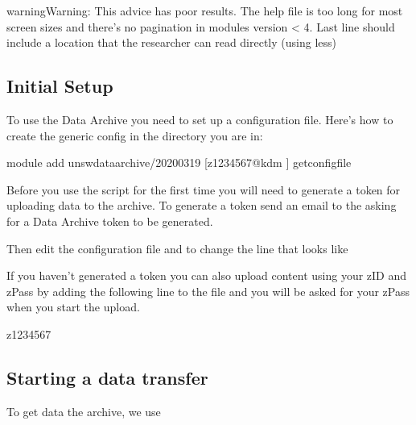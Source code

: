 \documentclass[letterpaper,10pt,english]{sphinxmanual}
\begin{document}
\begin{sphinxadmonition}{warning}{Warning:}
This advice has poor results. The help file is too long for most screen sizes and there’s no pagination in modules version < 4. Last line should include a location that the researcher can read directly (using less)
\end{sphinxadmonition}


\subsection{Initial Setup}
\label{\detokenize{storage/data_archive:initial-setup}}
To use the Data Archive you need to set up a configuration file. Here’s how to create the generic config in the directory you are in:

\begin{sphinxVerbatim}\PYGZdl{} module add unswdataarchive/2020\PYGZhy{}03\PYGZhy{}19
[z1234567@kdm \PYGZti{}]\PYGZdl{} get\PYGZhy{}config\PYGZhy{}file
\end{sphinxVerbatim}

Before you use the script for the first time you will need to generate a token for uploading data to the archive. To generate a token send an email to the  asking for a Data Archive token to be generated.

Then edit the configuration file  and to change the line that looks like 

If you haven’t generated a token you can also upload content using your zID and zPass by adding the following line to the file  and you will be asked for your zPass when you start the upload.

\begin{sphinxVerbatim}[commandchars=\\\{\}]
z1234567
\end{sphinxVerbatim}


\subsection{Starting a data transfer}
\label{\detokenize{storage/data_archive:starting-a-data-transfer}}
To get data  the archive, we use 
\end{document}
